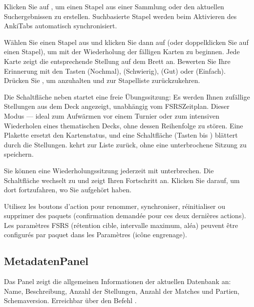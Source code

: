 \documentclass[letterpaper,10pt,german]{sphinxmanual}
\begin{document}
\sphinxAtStartPar
{} Klicken Sie auf , um einen Stapel aus einer Sammlung oder den aktuellen Suchergebnissen zu erstellen. Suchbasierte Stapel werden beim Aktivieren des Anki\sphinxhyphen{}Tabs automatisch synchronisiert.

\sphinxAtStartPar
{} Wählen Sie einen Stapel aus und klicken Sie dann auf  (oder doppelklicken Sie auf einen Stapel), um mit der Wiederholung der fälligen Karten zu beginnen. Jede Karte zeigt die entsprechende Stellung auf dem Brett an. Bewerten Sie Ihre Erinnerung mit den Tasten  (Nochmal),  (Schwierig),  (Gut) oder  (Einfach). Drücken Sie , um anzuhalten und zur Stapelliste zurückzukehren.

\sphinxAtStartPar
{} Die Schaltfläche  neben  startet eine freie Übungssitzung: Es werden Ihnen zufällige Stellungen aus dem Deck angezeigt, unabhängig vom FSRS\sphinxhyphen{}Zeitplan. Dieser Modus  — ideal zum Aufwärmen vor einem Turnier oder zum intensiven Wiederholen eines thematischen Decks, ohne dessen Reihenfolge zu stören. Eine \sphinxhyphen{}Plakette ersetzt den Kartenstatus, und eine Schaltfläche  (Tasten  bis ) blättert durch die Stellungen.  kehrt zur Liste zurück, ohne eine unterbrochene Sitzung zu speichern.

\sphinxAtStartPar
{} Sie können eine Wiederholungssitzung jederzeit mit  unterbrechen. Die Schaltfläche wechselt zu  und zeigt Ihren Fortschritt an. Klicken Sie darauf, um dort fortzufahren, wo Sie aufgehört haben.

\sphinxAtStartPar
{} Utilisez les boutons d’action pour renommer,
synchroniser, réinitialiser ou supprimer des paquets (confirmation demandée
pour ces deux dernières actions). Les paramètres FSRS (rétention cible,
intervalle maximum, aléa) peuvent être configurés par paquet dans les
Paramètres (icône engrenage).


\subsection{Metadaten\sphinxhyphen{}Panel}
\label{\detokenize{manuel:panneau-metadonnees}}\label{\detokenize{manuel:panneau-metadata}}
\sphinxAtStartPar
Das Panel  zeigt die allgemeinen Informationen der aktuellen Datenbank an: Name, Beschreibung, Anzahl der Stellungen, Anzahl der Matches und Partien, Schemaversion. Erreichbar über den Befehl .
\end{document}
